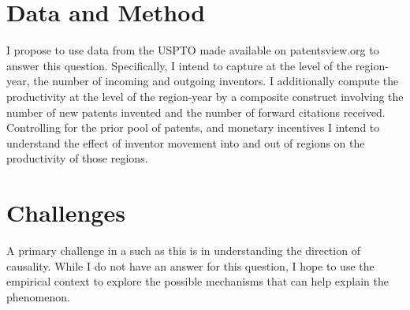 \documentclass[12pt]{article}
\begin{document}
\section{Data and Method}
I propose to use data from the USPTO made available on patentsview.org to answer this question. Specifically, I intend to capture at the level of the region-year, the number of incoming and outgoing inventors. I additionally compute the productivity at the level of the region-year by a composite construct involving the number of new patents invented and the number of forward citations received. Controlling for the prior pool of patents, and monetary incentives I intend to understand the effect of inventor movement into and out of regions on the productivity of those regions.

\section{Challenges}
A primary challenge in a such as this is in understanding the direction of causality. While I do not have an answer for this question, I hope to use the empirical context to explore the possible mechanisms that can help explain the phenomenon.

 

\end{document}
